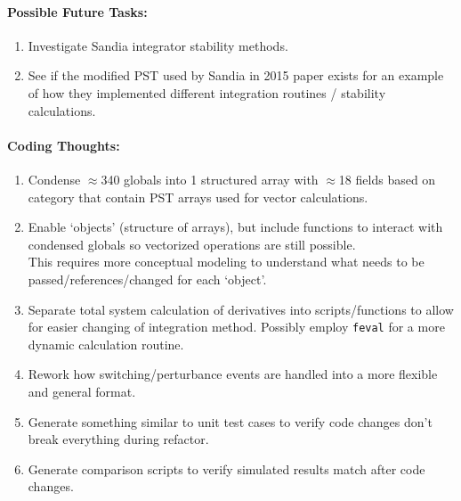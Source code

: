 \documentclass[12pt]{article}
\begin{document}
\begin{multicols}{2}
\paragraph{Possible Future Tasks:} %
	\begin{enumerate}
		\item Investigate Sandia integrator stability methods.	
		\item See if the modified PST used by Sandia in 2015 paper exists for an example of how they implemented different integration routines / stability calculations.	
	\end{enumerate}

\vfill\null
\columnbreak

\paragraph{Coding Thoughts:} 
	\begin{enumerate}

		\itemsep 0em 
		\item Condense $\approx$340 globals into 1 structured array with $\approx$18 fields based on category that contain PST arrays used for vector calculations.
		\item Enable `objects' (structure of arrays), but include functions to interact with condensed globals so vectorized operations are still possible.\\
		This requires more conceptual modeling to understand what needs to be passed/references/changed for each `object'.
		\item Separate total system calculation of derivatives into scripts/functions to allow for easier changing of integration method.
		Possibly employ \verb|feval| for a more dynamic calculation routine.
		\item Rework how switching/perturbance events are handled into a more flexible and general format.
		\item Generate something similar to unit test cases to verify code changes don't break everything during refactor.
		\item Generate comparison scripts to verify simulated results match after code changes.
	\end{enumerate}
	



\end{multicols}
\end{document}
